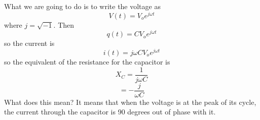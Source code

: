 \documentclass[11pt, oneside]{article}
\begin{document}
What we are going to do is to write the voltage as
\[ V(t) = V_o e^{j\omega t} \]
where $j = \sqrt{-1}$.  Then
\[ q(t) = C V_o e^{j\omega t}  \]
so the current is
\[ i(t) = j \omega C V_o e^{j\omega t}  \]
so the equivalent of the resistance for the capacitor is
\[ X_C = \frac{1}{j \omega C} \]
\[ = -\frac{j}{\omega C } \]
What does this mean?  It means that when the voltage is at the peak of its cycle, the current through the capacitor is 90 degrees out of phase with it.
\end{document}
